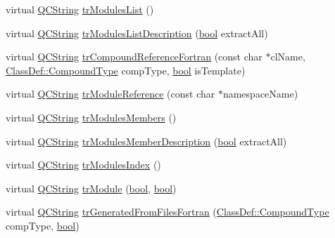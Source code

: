 \begin{DoxyCompactItemize}
\item 
virtual \hyperlink{class_q_c_string}{Q\+C\+String} \hyperlink{class_translator_chinesetraditional_a0ea6d46cf9909297807b95398e087dfb}{tr\+Modules\+List} ()
\item 
virtual \hyperlink{class_q_c_string}{Q\+C\+String} \hyperlink{class_translator_chinesetraditional_ab4c7704858f5c6b7d92b9a367c315b34}{tr\+Modules\+List\+Description} (\hyperlink{qglobal_8h_a1062901a7428fdd9c7f180f5e01ea056}{bool} extract\+All)
\item 
virtual \hyperlink{class_q_c_string}{Q\+C\+String} \hyperlink{class_translator_chinesetraditional_a7a1b3c9186c8afb16d7538fbd7f66f0b}{tr\+Compound\+Reference\+Fortran} (const char $\ast$cl\+Name, \hyperlink{class_class_def_ae70cf86d35fe954a94c566fbcfc87939}{Class\+Def\+::\+Compound\+Type} comp\+Type, \hyperlink{qglobal_8h_a1062901a7428fdd9c7f180f5e01ea056}{bool} is\+Template)
\item 
virtual \hyperlink{class_q_c_string}{Q\+C\+String} \hyperlink{class_translator_chinesetraditional_a63c0050b0ba4948ed0edb913712b1176}{tr\+Module\+Reference} (const char $\ast$namespace\+Name)
\item 
virtual \hyperlink{class_q_c_string}{Q\+C\+String} \hyperlink{class_translator_chinesetraditional_af13e010ffc89e71b48880caec4e508d1}{tr\+Modules\+Members} ()
\item 
virtual \hyperlink{class_q_c_string}{Q\+C\+String} \hyperlink{class_translator_chinesetraditional_a9bf54c19960f31410a7c1d3e06e71a95}{tr\+Modules\+Member\+Description} (\hyperlink{qglobal_8h_a1062901a7428fdd9c7f180f5e01ea056}{bool} extract\+All)
\item 
virtual \hyperlink{class_q_c_string}{Q\+C\+String} \hyperlink{class_translator_chinesetraditional_a31b911b3155793f6c936e4641d6c0861}{tr\+Modules\+Index} ()
\item 
virtual \hyperlink{class_q_c_string}{Q\+C\+String} \hyperlink{class_translator_chinesetraditional_a351a730e1e5f987c48e35459f7423d18}{tr\+Module} (\hyperlink{qglobal_8h_a1062901a7428fdd9c7f180f5e01ea056}{bool}, \hyperlink{qglobal_8h_a1062901a7428fdd9c7f180f5e01ea056}{bool})
\item 
virtual \hyperlink{class_q_c_string}{Q\+C\+String} \hyperlink{class_translator_chinesetraditional_a97a68956eb70c4bd1187c14726069c29}{tr\+Generated\+From\+Files\+Fortran} (\hyperlink{class_class_def_ae70cf86d35fe954a94c566fbcfc87939}{Class\+Def\+::\+Compound\+Type} comp\+Type, \hyperlink{qglobal_8h_a1062901a7428fdd9c7f180f5e01ea056}{bool})
\item 

\end{DoxyCompactItemize}
